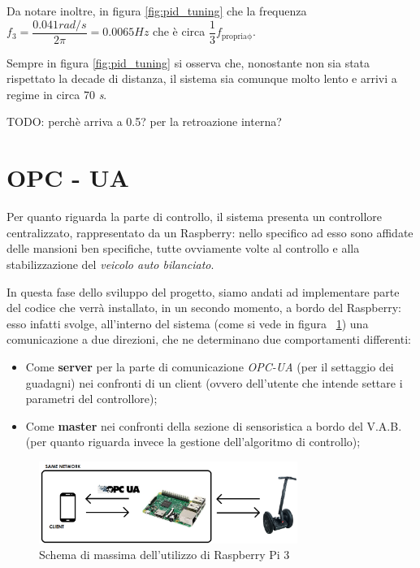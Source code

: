 Da notare inoltre, in figura \ref{fig:pid_tuning} che la frequenza $f_3 = \dfrac{0.041 \textit{rad/s}}{2\pi} = 0.0065 Hz$ che è circa $\dfrac{1}{3} 	f_{\mathrm{propria\phi}}$.

Sempre in figura \ref{fig:pid_tuning} si osserva che, nonostante non sia stata rispettato la decade di distanza, il sistema sia comunque molto lento e arrivi a regime in circa 70 \textit{s}.

TODO: perchè arriva a 0.5? per la retroazione interna?

\section{OPC - UA}
Per quanto riguarda la parte di controllo, il sistema presenta un controllore centralizzato, rappresentato da un Raspberry: nello specifico ad esso sono affidate delle mansioni ben specifiche, tutte ovviamente volte al controllo e alla stabilizzazione del \textit{veicolo auto bilanciato}.

In questa fase dello sviluppo del progetto, siamo andati ad implementare parte del codice che verrà installato, in un secondo momento, a bordo del Raspberry: esso infatti svolge, all'interno del sistema (come si vede in figura ~\ref{fig:OPCUA_schema}) una comunicazione a due direzioni, che ne determinano due comportamenti differenti:
\begin{itemize}
	\item Come \textbf{server} per la parte di comunicazione \textit{OPC-UA} (per il settaggio dei guadagni) nei confronti di un client (ovvero dell'utente che intende settare i parametri del controllore);
	\item Come \textbf{master} nei confronti della sezione di sensoristica a bordo del V.A.B. (per quanto riguarda invece la gestione dell'algoritmo di controllo);
\end{itemize}

 \begin{figure}[H]
	\centering   	
	\includegraphics[width=0.75\textwidth]{Immagini/OPCUA_schema.png}
	\caption{Schema di massima dell'utilizzo di Raspberry Pi 3}
	\label{fig:OPCUA_schema}
\end{figure}

